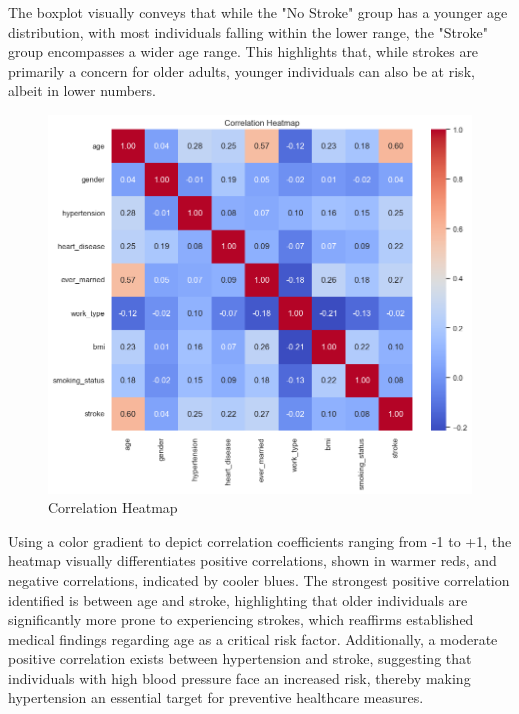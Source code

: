 \documentclass[runningheads]{llncs}
\begin{document}
\begin{enumerate}
The boxplot visually conveys that while the "No Stroke" group has a younger age distribution, with most individuals falling within the lower range, the "Stroke" group encompasses a wider age range. This highlights that, while strokes are primarily a concern for older adults, younger individuals can also be at risk, albeit in lower numbers.

\newpage
\begin{figure}
    \centering
    \includegraphics[width=1.0\linewidth]{eda3.png}
    \caption{Correlation Heatmap} 
    \label{fig:enter-label}
\end{figure}

Using a color gradient to depict correlation coefficients ranging from -1 to +1, the heatmap visually differentiates positive correlations, shown in warmer reds, and negative correlations, indicated by cooler blues. The strongest positive correlation identified is between age and stroke, highlighting that older individuals are significantly more prone to experiencing strokes, which reaffirms established medical findings regarding age as a critical risk factor. Additionally, a moderate positive correlation exists between hypertension and stroke, suggesting that individuals with high blood pressure face an increased risk, thereby making hypertension an essential target for preventive healthcare measures.


\end{enumerate}
\end{document}
